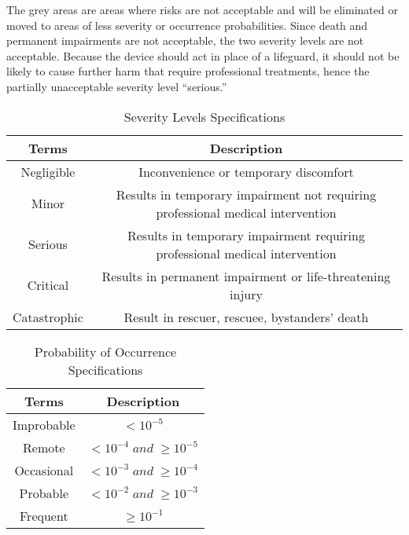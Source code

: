     The grey areas are areas where risks are not acceptable and will be eliminated or moved to 
    areas of less severity or occurrence probabilities. Since death and permanent impairments are not acceptable, 
    the two severity levels are not acceptable. Because the device should act in place of a lifeguard, it should not be 
    likely to cause further harm that require professional treatments, hence the partially unacceptable severity level “serious.” \\
    
\begin{table}[h!]
    \begin{center}
    \begin{tabular}{|c|c|}
        \hline
        Terms&Description\\
        \hline
        Negligible&Inconvenience or temporary discomfort\\
        \hline
        Minor  &Results in temporary impairment not requiring professional medical intervention\\
        \hline
        Serious&Results in temporary impairment requiring professional medical intervention\\
        \hline
        Critical&Results in permanent impairment or life-threatening injury\\
        \hline
        Catastrophic&Result in rescuer, rescuee, bystanders’ death\\
        \hline
    \end{tabular}
    \caption{Severity Levels Specifications}
    \label{tab:Figure}
\end{center}
\end{table}

\begin{table}[H]
    \begin{center}
    \begin{tabular}{|c|c|}
        \hline
        Terms&Description\\
        \hline
        Improbable&$<10^{-5}$\\
        \hline
        Remote&$<10^{-4}\; and \; \geq 10^{-5}$\\
        \hline
        Occasional&$<10^{-3} \;and \;\geq 10^{-4}$\\
        \hline
        Probable&$<10^{-2} \; and\; \geq 10^{-3}$\\
        \hline
        Frequent&$\geq 10^{-1}$\\
        \hline
    \end{tabular}
    \caption{Probability of Occurrence Specifications}
    \label{tab:Figure}
\end{center}
\end{table}   
 

% 